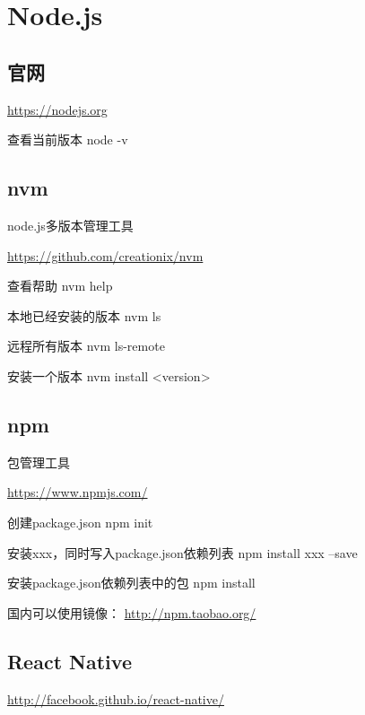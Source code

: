
\chapter{Node.js}
\section{官网}
\url{https://nodejs.org}

查看当前版本 node -v

\section{nvm}
node.js多版本管理工具

\url{https://github.com/creationix/nvm}

查看帮助  nvm help

本地已经安装的版本  nvm ls

远程所有版本 nvm ls-remote

安装一个版本  nvm install <version>

\section{npm}
包管理工具

\url{https://www.npmjs.com/}

创建package.json  npm init

安装xxx，同时写入package.json依赖列表   npm install xxx --save

安装package.json依赖列表中的包 npm install

国内可以使用镜像：
\url{http://npm.taobao.org/}

\section{React Native}
\url{http://facebook.github.io/react-native/}